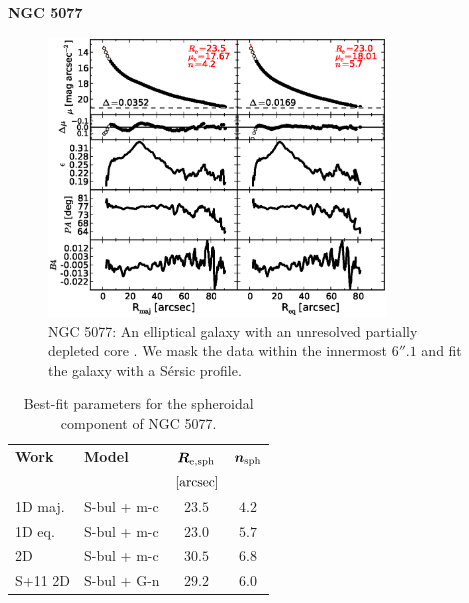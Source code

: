 \documentclass[preprint2]{emulateapj}
\newcommand{\fitfigurewidth}{0.8\textwidth}
\begin{document}
  \clearpage\newpage\noindent
  {\bf NGC 5077 \\}

  \begin{figure}[h]
  \begin{center}
  \includegraphics[width=\fitfigurewidth]{n5077_1Dfit.eps}
  \caption{NGC 5077:  
  An elliptical galaxy with an unresolved partially depleted core \citep{trujillo2004coresersicmodel}. 
  We mask the data within the innermost $6''.1$ and fit the galaxy with a S\'ersic profile. }
  \end{center}
  \end{figure}

  \begin{table}[h]
  \small
  \caption{Best-fit parameters for the spheroidal component of NGC 5077.}
  \begin{center}
  \begin{tabular}{llcc}
  \hline
  {\bf Work} & {\bf Model}   & $\bm R_{\rm e,sph}$    & $\bm n_{\rm sph}$ \\
    &  &  $[\rm arcsec]$ & \\
  \hline
  1D maj. & S-bul + m-c & $23.5$  &  $4.2$ \\
  1D eq.  & S-bul + m-c & $23.0$  &  $5.7$ \\
  2D      & S-bul + m-c & $30.5$  &  $6.8$ \\
  \hline
  S+11 2D         & S-bul + G-n & $29.2$  &  $6.0$ \\
  \hline
  \end{tabular}
  \end{center}
  \label{tab:n5077}
  \end{table}
\end{document}
